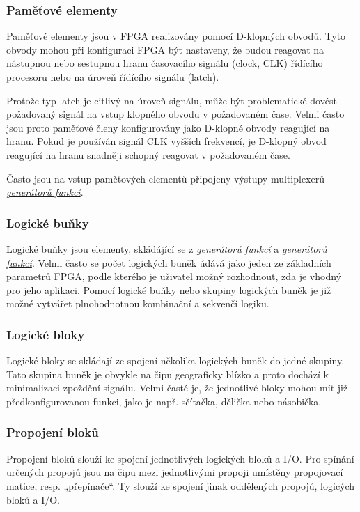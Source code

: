 \documentclass[a4paper, twoside, 11pt]{article}
\begin{document}
	\subsubsection{Paměťové elementy}\label{subsubsec:pametove-elementy}
		Paměťové elementy jsou v FPGA realizovány pomocí D-klopných obvodů. Tyto obvody mohou při konfiguraci FPGA být nastaveny, že budou reagovat na nástupnou nebo sestupnou hranu časovacího signálu (clock, CLK) řídícího procesoru nebo na úroveň řídícího signálu (latch).\cite{Sass2010}\par
		Protože typ latch je citlivý na úroveň signálu, může být problematické dovést požadovaný signál na vstup klopného obvodu v požadovaném čase. Velmi často jsou proto paměťové členy konfigurovány jako D-klopné obvody reagující na hranu. Pokud je používán signál CLK vyšších frekvencí, je D-klopný obvod reagující na hranu snadněji schopný reagovat v požadovaném čase. \cite{Sass2010}\par
		Často jsou na vstup paměťových elementů připojeny výstupy multiplexerů \hyperref[subsubsec:generatory-funkci]{\textit{generátorů funkcí}}. \cite{Sass2010}

		\subsubsection{Logické buňky}
			Logické buňky jsou elementy, skládájící se z \hyperref[subsubsec:generatory-funkci]{\textit{generátorů funkcí}} a \hyperref[subsubsec:generatory-funkci]{\textit{generátorů funkcí}}. Velmi často se počet logických buněk údává jako jeden ze základních parametrů FPGA, podle kterého je uživatel možný rozhodnout, zda je vhodný pro jeho aplikaci. Pomocí logické buňky nebo skupiny logických buněk je již možné vytvářet plnohodnotnou kombinační a sekvenčí logiku.\cite{Sass2010}

		\subsubsection{Logické bloky}\label{subsubsec:logicke-bloky}
			Logické bloky se skládají ze spojení několika logických buněk do jedné skupiny. Tato skupina buněk je obvykle na čipu geograficky blízko a proto dochází k minimalizaci zpoždění signálu. Velmi časté je, že jednotlivé bloky mohou mít již předkonfigurovanou funkci, jako je např. sčítačka, dělička nebo násobička. \cite{Sass2010}

		\subsubsection{Propojení bloků}
			Propojení bloků slouží ke spojení jednotlivých logických bloků a I/O. Pro spínání určených propojů jsou na čipu mezi jednotlivými propoji umístěny propojovací matice, resp. „přepínače“. Ty slouží ke spojení jinak oddělených propojů, logicých bloků a I/O. \cite{Sass2010}
\end{document}
